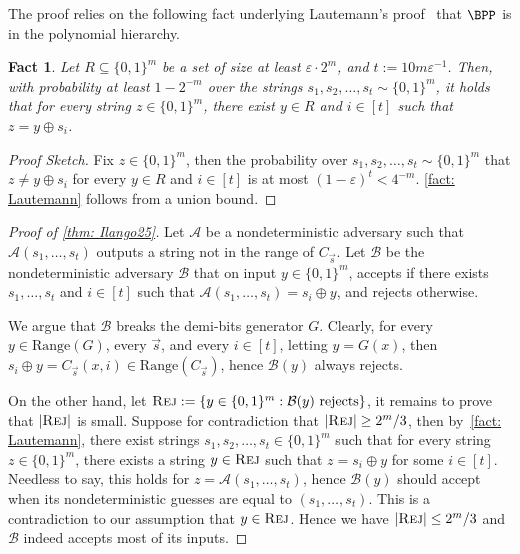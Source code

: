 \documentclass[10pt,a4paper]{article}
\newtheorem{fact}[theorem]{Fact}
\theoremstyle{definition}
\theoremstyle{remark}
\newcommand{\eps}{\varepsilon}
\newcommand{\calA}{\mathcal{A}}
\newcommand{\calB}{\mathcal{B}}
\newcommand{\Range}{\mathrm{Range}}
\begin{document}
The proof relies on the following fact underlying Lautemann's proof~\cite{Lautemann83} that $\BPP$ is in the polynomial hierarchy.
\begin{fact}\label{fact: Lautemann}
    Let $R\subseteq \{0, 1\}^m$ be a set of size at least $\eps \cdot 2^m$, and $t := 10m\eps^{-1}$. Then, with probability at least $1-2^{-m}$ over the strings $s_1, s_2, \dots, s_t \sim \{0, 1\}^m$, it holds that for every string $z\in\{0, 1\}^m$, there exist $y\in R$ and $i\in[t]$ such that $z = y \oplus s_i$.
\end{fact}
\begin{proof}[Proof Sketch]
    Fix $z\in \{0, 1\}^m$, then the probability over $s_1, s_2, \dots, s_t\sim\{0, 1\}^m$ that $z\ne y\oplus s_i$ for every $y\in R$ and $i\in [t]$ is at most $(1-\eps)^t < 4^{-m}$. \autoref{fact: Lautemann} follows from a union bound.
\end{proof}

\def\Rej{\textsc{Rej}}
\begin{proof}[Proof of \autoref{thm: Ilango25}]
    Let $\calA$ be a nondeterministic adversary such that $\calA(s_1, \dots, s_t)$ outputs a string not in the range of $C_{\vec{s}}$. Let $\calB$ be the nondeterministic adversary $\calB$ that on input $y \in \{0, 1\}^m$, accepts if there exists $s_1, \dots, s_t$ and $i\in [t]$ such that $\calA(s_1, \dots, s_t) = s_i \oplus y$, and rejects otherwise. 
    
    We argue that $\calB$ breaks the demi-bits generator $G$. Clearly, for every $y\in \Range(G)$, every $\vec{s}$, and every $i\in[t]$, letting $y = G(x)$, then $s_i\oplus y = C_{\vec{s}}(x, i) \in \Range(C_{\vec{s}})$, hence $\calB(y)$ always rejects.

    On the other hand, let $\Rej := \{y \in \{0, 1\}^m: \calB(y)\text{ rejects}\}$, it remains to prove that $|\Rej|$ is small. Suppose for contradiction that $|\Rej| \ge 2^m / 3$, then by~\autoref{fact: Lautemann}, there exist strings $s_1, s_2, \dots, s_t \in \{0, 1\}^m$ such that for every string $z \in \{0, 1\}^m$, there exists a string $y \in \Rej$ such that $z = s_i\oplus y$ for some $i\in [t]$. Needless to say, this holds for $z = \calA(s_1, \dots, s_t)$, hence $\calB(y)$ should accept when its nondeterministic guesses are equal to $(s_1, \dots, s_t)$. This is a contradiction to our assumption that $y \in \Rej$. Hence we have $|\Rej| \le 2^m/3$ and $\calB$ indeed accepts most of its inputs.
\end{proof}
\end{document}
